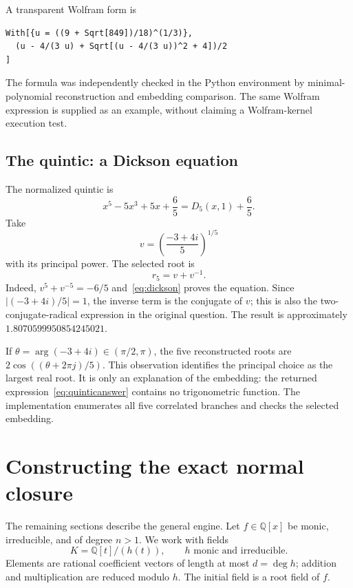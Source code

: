 \documentclass[11pt]{article}
\theoremstyle{definition}\newtheorem{definition}[theorem]{Definition}
\theoremstyle{remark}\newtheorem{remark}[theorem]{Remark}
\newcommand{\Q}{\mathbb Q}\newcommand{\C}{\mathbb C}\newcommand{\Z}{\mathbb Z}
\begin{document}
A transparent Wolfram form is
\begin{lstlisting}
With[{u = ((9 + Sqrt[849])/18)^(1/3)},
  (u - 4/(3 u) + Sqrt[(u - 4/(3 u))^2 + 4])/2
]
\end{lstlisting}
The formula was independently checked in the Python environment by minimal-
polynomial reconstruction and embedding comparison. The same Wolfram expression
is supplied as an example, without claiming a Wolfram-kernel execution test.

\subsection{The quintic: a Dickson equation}

The normalized quintic is
\begin{equation}
 x^5-5x^3+5x+\frac65=D_5(x,1)+\frac65.
\end{equation}
Take
\begin{equation}
 v=\left(\frac{-3+4i}{5}\right)^{1/5}
\end{equation}
with its principal power. The selected root is
\begin{equation}\boxed{\displaystyle r_5=v+v^{-1}.}\label{eq:quinticanswer}
\end{equation}
Indeed, $v^5+v^{-5}=-6/5$ and~\eqref{eq:dickson} proves the equation.
Since $|(-3+4i)/5|=1$, the inverse term is the conjugate of $v$; this is also
the two-conjugate-radical expression in the original question. The result is
approximately $1.8070599950854245021$.

If $\theta=\arg(-3+4i)\in(\pi/2,\pi)$, the five reconstructed roots are
$2\cos((\theta+2\pi j)/5)$. This observation identifies the principal choice
as the largest real root. It is only an explanation of the embedding: the
returned expression~\eqref{eq:quinticanswer} contains no trigonometric function.
The implementation enumerates all five correlated branches and checks the
selected embedding.

\section{Constructing the exact normal closure}\label{sec:closure}

The remaining sections describe the general engine. Let $f\in\Q[x]$ be monic,
irreducible, and of degree $n>1$. We work with fields
\begin{equation}
 K=\Q[t]/(h(t)),\qquad h\text{ monic and irreducible}.
\end{equation}
Elements are rational coefficient vectors of length at most $d=\deg h$;
addition and multiplication are reduced modulo $h$. The initial field is a
root field of $f$.
\end{document}
